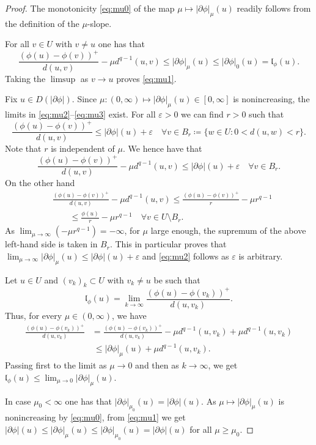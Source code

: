 \documentclass[10pt,a4paper]{amsart}
\newcommand{\epsi}{\varepsilon}
\renewcommand{\sl}{|\partial \phi|}
\newcommand{\gl}{\mathfrak{l}_\phi}
\begin{document}
\begin{proof}
  The monotonicity  \eqref{eq:mu0}  of the map $\mu \mapsto \sl_\mu(u)$ readily follows
  from the definition of the $\mu$-slope.
  
  For all $v\in U$  with $v \ne u$  one has that
  $$\frac{(\phi(u) -
    \phi(v))^+}{d(u,v)} -  {\mu}d^{q-1}(u,v) \leq \sl_\mu(u)
  \leq  \sl_0(u)= \gl(u).$$
  Taking the $\limsup$ as $v\to u$ proves \eqref{eq:mu1}.

  Fix $u \in D(\sl)$.   Since   $\mu:(0,\infty)\mapsto
  \sl_\mu(u)\in [0,\infty]$  is nonincreasing, the  
  limits in \eqref{eq:mu2}--\eqref{eq:mu3} exist. For all $\epsi>0$ we can find $r>0$ such that 
$$\frac{(\phi(u) -
    \phi(v))^+}{d(u,v)} \leq \sl(u)+\epsi \quad \forall v \in B_r\coloneqq\{w\in U :  0 <  d(u,w)<r\} .$$
  Note that $r$ is independent of $\mu$. We hence have that 
  $$\frac{(\phi(u) -
    \phi(v))^+}{d(u,v)} -  {\mu}d^{q-1}(u,v) \leq \sl(u)+\epsi
  \quad \forall v \in B_r .$$
  On the other hand
   \begin{align*}
       & \frac{(\phi(u) -
    \phi(v))^+}{d(u,v)} -  {\mu}d^{q-1}(u,v) \leq \frac{(\phi(u) -
    \phi(v))^+}{r} -  {\mu}r^{q-1}  \\
    &\qquad \le \frac{\phi(u)}{r} - \mu r^{q-1}  \quad \forall v \in
  U\setminus B_r.
  \end{align*}
  As $\lim_{\mu \to \infty}(-\mu r^{q-1}) = -\infty$,  for $\mu$ large enough,  the supremum of the
  above left-hand side is taken in $B_r$. This in particular proves that  
  $ \lim_{\mu \to \infty} \sl_\mu(u) \leq \sl(u)+\epsi$ 
  and \eqref{eq:mu2} follows as $\epsi$ is arbitrary.
  
 Let $u \in U$ and $(v_k)_k \subset U$ with $v_k \ne u$ be such that
\[
\gl(u) = \lim_{k \to \infty} \frac{(\phi(u) -
    \phi(v_k))^+}{d(u,v_k)}.
\]
Thus, for every $\mu \in (0,\infty)$, we have
\begin{align*}
\frac{(\phi(u) -  \phi(v_k))^+}{d(u,v_k)} &= \frac{(\phi(u) -  \phi(v_k))^+}{d(u,v_k)} - \mu d^{q-1}(u,v_k) + \mu d^{q-1} (u,v_k)
  \\
  &\ \leq \sl_\mu(u) + \mu d^{q-1} (u,v_k).
\end{align*}
Passing first to the limit as $\mu \to 0$ and then as $k \to \infty$, we get $\gl (u) \le \lim_{\mu \to 0} \sl_{\mu}(u)$.


  In case $\mu_0 <\infty$ one has that $\sl_{\mu_0}(u) = \sl(u)$. As
  $\mu \mapsto \sl_\mu(u)$ is nonincreasing by \eqref{eq:mu0}, from
  \eqref{eq:mu1} we get
  $\sl(u) \leq \sl_\mu(u) \leq \sl_{\mu_0}(u) = \sl(u)$ for all $\mu
  \geq \mu_0$. 
\end{proof}
\end{document}
